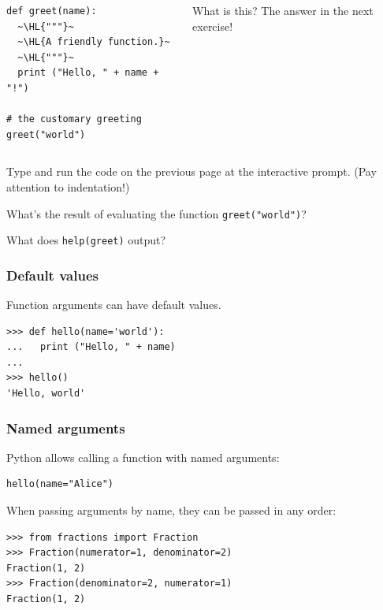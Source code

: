 \documentclass[english,serif,mathserif,xcolor=pdftex,dvipsnames,table]{beamer}
\begin{document}
\begin{frame}[fragile]
  \begin{columns}[t]
    \begin{column}{0.5\textwidth}
\begin{lstlisting}
def greet(name):
  ~\HL{"""}~
  ~\HL{A friendly function.}~
  ~\HL{"""}~
  print ("Hello, " + name + "!")

# the customary greeting
greet("world")
\end{lstlisting}
    \end{column}
    \begin{column}{0.5\textwidth}
      \raggedleft
      What is this? The answer in the next exercise!
    \end{column}
  \end{columns}
\end{frame}

\begin{frame}
  \begin{exercise*}[3]
    Type and run the code on the previous page at the interactive
    prompt. (Pay attention to indentation!)

    \+
    What's the result of evaluating the function \texttt{greet("world")}?

    \+
    What does \texttt{help(greet)} output?
  \end{exercise*}
\end{frame}


\begin{frame}[fragile]
  \frametitle{Default values}

  Function arguments can have default values.
\begin{lstlisting}
>>> def hello(name='world'):
...   print ("Hello, " + name)
...
>>> hello()
'Hello, world'
\end{lstlisting}
\end{frame}


\begin{frame}[fragile]
  \frametitle{Named arguments}
Python allows calling a function with named arguments:
\begin{lstlisting}
hello(name="Alice")
\end{lstlisting}

\+
When passing arguments by name, they can be passed in any order:
\begin{lstlisting}
>>> from fractions import Fraction
>>> Fraction(numerator=1, denominator=2)
Fraction(1, 2)
>>> Fraction(denominator=2, numerator=1)
Fraction(1, 2)
\end{lstlisting}
\end{frame}
\end{document}
